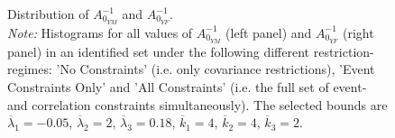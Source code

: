 \documentclass[a4paper,11pt,listof=nochaptergap,oneside,pointednumbers,bibtotoc,bigheadings,liststotoc,hidelinks]{scrbook}
\theoremstyle{mysatz}
\theoremstyle{mydefinition}
\theoremstyle{mytheorem}
\theoremstyle{mybemerkung}
\begin{document}
\begin{figure}[!h]
   \centering
   \setlength\fboxsep{0pt}
   \setlength\fboxrule{0pt}
      \caption[Distribution of $A_{0_{YM}}^{-1}$ and $A_{0_{YF}}^{-1}$.]{Distribution of $A_{0_{YM}}^{-1}$ and $A_{0_{YF}}^{-1}$.\\
      \textit{Note:} Histograms for all values of $A_{0_{YM}}^{-1}$ (left panel) and $A_{0_{YF}}^{-1}$ (right panel) in an identified set under the following different restriction-regimes: 'No Constraints' (i.e. only covariance restrictions), 'Event Constraints Only' and 'All Constraints' (i.e. the full set of event- and correlation constraints simultaneously). The selected bounds are $\overline{\lambda}_1 = -0.05$, $\overline{\lambda}_2 = 2$, $\overline{\lambda}_3 = 0.18$, $\overline{k}_1 = 4$, $\overline{k}_2 = 4$, $\overline{k}_3 = 2$.}   \label{fig:distribution_impact_matrices_type1}
\end{figure}
\end{document}
